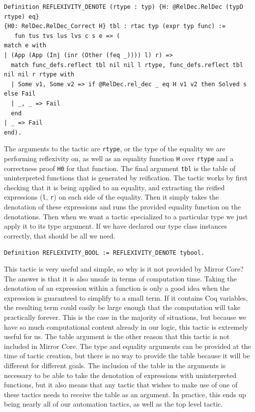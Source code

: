 \documentclass{puthesis}
\begin{document}
\begin{lstlisting}
Definition REFLEXIVITY_DENOTE (rtype : typ) {H: @RelDec.RelDec (typD rtype) eq}
{H0: RelDec.RelDec_Correct H} tbl : rtac typ (expr typ func) := 
   fun tus tvs lus lvs c s e => (
match e with
| (App (App (Inj (inr (Other (feq _)))) l) r) =>
  match func_defs.reflect tbl nil nil l rtype, func_defs.reflect tbl nil nil r rtype with
  | Some v1, Some v2 => if @RelDec.rel_dec _ eq H v1 v2 then Solved s else Fail
  | _, _ => Fail
  end
| _ => Fail
end).
\end{lstlisting}

The arguments to the tactic are \lstinline|rtype|, or the type of the equality we are
performing reflexivity on, as well as an equality function \lstinline|H| over
\lstinline|rtype| and a correctness proof \lstinline|H0| for that function. The final
argument \lstinline|tbl| is the table of uninterpreted functions that is generated by reification.
 The
tactic works by first checking that it is being applied to an
equality, and extracting the reified expressions (\lstinline|l|, \lstinline|r|) on each side of the
equality. Then it simply takes the denotation of these expressions and
runs the provided equality function on the denotations. Then when we
want a tactic specialized to a particular type we just apply it to its
type argument. If we have declared our type class instances correctly,
that should be all we need.

\begin{lstlisting}
Definition REFLEXIVITY_BOOL := REFLEXIVITY_DENOTE tybool.
\end{lstlisting}

This tactic is very useful and simple, so why is it not provided by
Mirror Core? The answer is that it is also unsafe in terms of
computation time. Taking the denotation of an expression within a
function is only a good idea when the expression is guaranteed to
simplify to a small term. If it contains Coq variables, the resulting
term could easily be large enough that the computation will take
practically forever. This is the case in the majority of situations,
but because we have so much computational content already in our
logic, this tactic is extremely useful for us. The table argument is
the other reason that this tactic is not included in Mirror Core. The
type and equality arguments can be provided at the time of tactic
creation, but there is no way to provide the table because it will be
different for different goals. The inclusion of the table in the
arguments is necessary to be able to take the denotation of
expressions with uninterpreted functions, but it also means that any
tactic that wishes to make use of one of these tactics needs to
receive the table as an argument. In practice, this ends up being
nearly all of our automation tactics, as well as the top level tactic.
\end{document}
